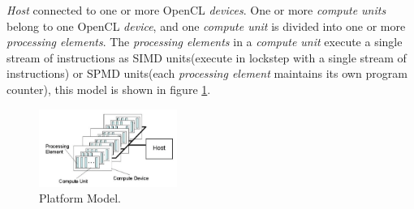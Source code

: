 \par{\emph{Host} connected to one or more OpenCL \emph{devices}. One or more 
    \emph{compute units} belong to one OpenCL \emph{device}, and one \emph{compute unit} is divided into one or more
    \emph{processing elements}. The \emph{processing elements} in a \emph{compute unit} execute a single stream of instructions
    as SIMD units(execute in lockstep with a single stream of instructions) or SPMD units(each \emph{processing element} 
    maintains its own program counter), this model is shown in figure \ref{PlatformModel}\cite{opencl12}.}

\begin{figure}[!h]
    \centering
    \includegraphics[width=0.4\textwidth]{figures/PlatformModel.png}
    \caption{Platform Model\cite{opencl12}.}
    \label{PlatformModel}
\end{figure}

